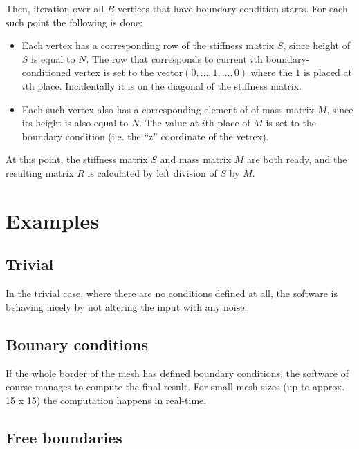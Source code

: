 \documentclass[a4paper,12pt]{article}
\begin{document}
Then, iteration over all $B$ vertices that have boundary condition starts. For each such point the following is done:

\begin{itemize}

  \item Each vertex has a corresponding row of the stiffness matrix $S$, since height of $S$ is equal to $N$. The row
  that corresponds to current $i$th boundary-conditioned vertex is set to the vector$(0,\ldots,1,\ldots,0)$ where the
  $1$ is placed at $i$th place. Incidentally it is on the diagonal of the stiffness matrix.
  
  \item Each such vertex also has a corresponding element of of mass matrix $M$, since its height is also equal to $N$.
  The value at $i$th place of $M$ is set to the boundary condition (i.e. the ``z'' coordinate of the vetrex).

\end{itemize}

At this point, the stiffness matrix $S$ and mass matrix $M$ are both ready, and the resulting matrix $R$ is calculated
by left division of $S$ by $M$.

\section{Examples}

\subsection{Trivial}

In the trivial case, where there are no conditions defined at all, the software is behaving nicely by not altering the
input with any noise.

\subsection{Bounary conditions}

If the whole border of the mesh has defined boundary conditions, the software of course manages to compute the final
result. For small mesh sizes (up to approx. 15 x 15) the computation happens in real-time.

\subsection{Free boundaries}
\end{document}
